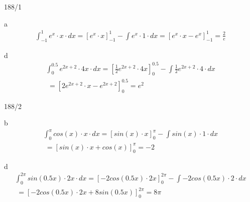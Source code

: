 \begin{exercise}{188/1}
  \item [a]
  \begin{gather*}
    \int_{-1}^{1} e^x \cdot x \cdot dx = \left[e^x \cdot x\right]_{-1}^{1} - \int e^x \cdot 1 \cdot dx = \left[e^x \cdot x - e^x\right]_{-1}^{1} = \frac{2}{e}
  \end{gather*}
  \item [d]
  \begin{gather*}
    \int_{0}^{0.5} e^{2x + 2} \cdot 4x \cdot dx = \left[\frac{1}{2}e^{2x + 2} \cdot 4x\right]_{0}^{0.5} - \int \frac{1}{2}e^{2x + 2} \cdot 4 \cdot dx \\
    \;= \left[2e^{2x + 2} \cdot x - e^{2x + 2}\right]_{0}^{0.5} = e^2
  \end{gather*}
\end{exercise}
\begin{exercise}{188/2}
  \item [b]
  \begin{gather*}
    \int_0^\pi cos(x) \cdot x \cdot dx = \left[sin(x) \cdot x\right]_0^\pi - \int sin(x) \cdot 1 \cdot dx \\
    \;= \left[sin(x) \cdot x + cos(x)\right]_0^\pi = -2
  \end{gather*}
  \item [d]
  \begin{gather*}
    \int_0^{2\pi} sin(0.5x) \cdot 2x \cdot dx = \left[-2cos(0.5x) \cdot 2x\right]_0^{2\pi} - \int -2cos(0.5x) \cdot 2 \cdot dx \\
    \;= \left[-2cos(0.5x) \cdot 2x + 8sin(0.5x)\right]_0^{2\pi} = 8\pi
  \end{gather*}
\end{exercise}
\newpage
